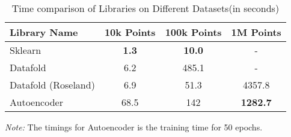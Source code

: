 \begin{itemize}
    \begin{table}[h]
    \centering
    \begin{tabular}{|l|c|c|c|}
        \hline
        \textbf{Library Name} & \textbf{10k Points} & \textbf{100k Points} & \textbf{1M Points} \\
        \hline
        \hline
        Sklearn & \textbf{1.3} & \textbf{10.0} & - \\
        \hline
        Datafold & 6.2 & 485.1 & - \\
        \hline
        Datafold (Roseland) & 6.9 & 51.3 & 4357.8 \\
        \hline      
        Autoencoder & 68.5 & 142 & \textbf{1282.7} \\
        \hline
    \end{tabular}
    \caption{Time comparison of Libraries on Different Datasets(in seconds)}
    \label{tab:library-comparison-timings}
    \end{table}
    \textit{Note: }The timings for Autoencoder is the training time for 50 epochs. 
\end{itemize}



